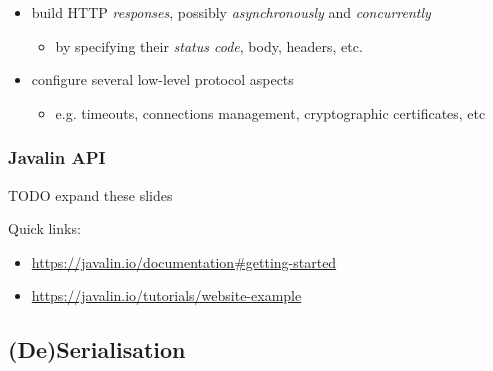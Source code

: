 \documentclass[presentation]{beamer}\mode<presentation>{\usetheme{AMSCesenaPurpleAndGold}}
\begin{document}
\begin{frame}
\begin{itemize}
        \vfill

        \item build HTTP \emph{responses}, possibly \emph{asynchronously} and \emph{concurrently}
        \begin{itemize}
            \item by specifying their \emph{status code}, body, headers, etc.
        \end{itemize}

        \vfill

        \item configure several low-level protocol aspects
        \begin{itemize}
            \item e.g. timeouts, connections management, cryptographic certificates, etc
        \end{itemize}
    \end{itemize}
\end{frame}

\begin{frame}%
    \frametitle{Javalin API}

    TODO expand these slides

    Quick links:
    \begin{itemize}
        \item \url{https://javalin.io/documentation\#getting-started}
        \item \url{https://javalin.io/tutorials/website-example}
    \end{itemize}

\end{frame}

\subsection{(De)Serialisation}
\end{document}
